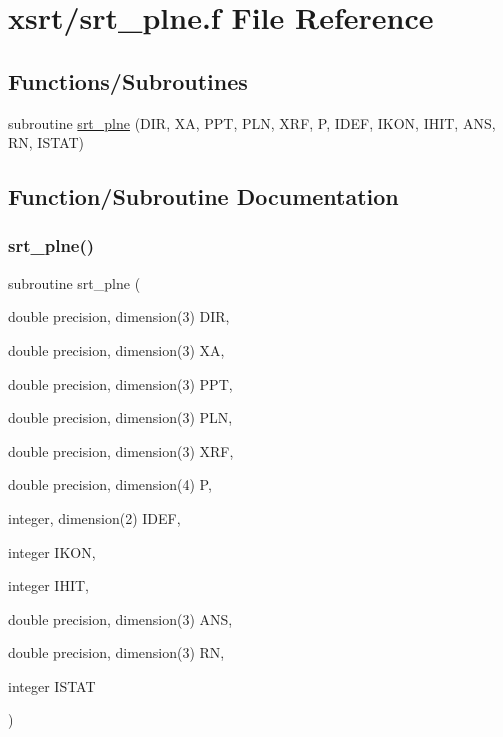 \hypertarget{srt__plne_8f}{}\section{xsrt/srt\+\_\+plne.f File Reference}
\label{srt__plne_8f}
\subsection*{Functions/\+Subroutines}
\begin{DoxyCompactItemize}
\item 
subroutine \hyperlink{srt__plne_8f_abbc0569b7ca3514680c762db89f0c1c7}{srt\+\_\+plne} (D\+IR, XA, P\+PT, P\+LN, X\+RF, P, I\+D\+EF, I\+K\+ON, I\+H\+IT, A\+NS, RN, I\+S\+T\+AT)
\end{DoxyCompactItemize}


\subsection{Function/\+Subroutine Documentation}
\mbox{\label{srt__plne_8f_abbc0569b7ca3514680c762db89f0c1c7}} 
\subsubsection{\texorpdfstring{srt\+\_\+plne()}{srt\_plne()}}
{\footnotesize\ttfamily subroutine srt\+\_\+plne (\begin{DoxyParamCaption}\item[{double precision, dimension(3)}]{D\+IR,  }\item[{double precision, dimension(3)}]{XA,  }\item[{double precision, dimension(3)}]{P\+PT,  }\item[{double precision, dimension(3)}]{P\+LN,  }\item[{double precision, dimension(3)}]{X\+RF,  }\item[{double precision, dimension(4)}]{P,  }\item[{integer, dimension(2)}]{I\+D\+EF,  }\item[{integer}]{I\+K\+ON,  }\item[{integer}]{I\+H\+IT,  }\item[{double precision, dimension(3)}]{A\+NS,  }\item[{double precision, dimension(3)}]{RN,  }\item[{integer}]{I\+S\+T\+AT }\end{DoxyParamCaption})}

